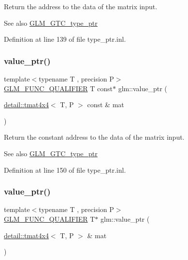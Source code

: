 Return the address to the data of the matrix input. \begin{DoxySeeAlso}{See also}
\hyperlink{group__gtc__type__ptr}{G\+L\+M\+\_\+\+G\+T\+C\+\_\+type\+\_\+ptr} 
\end{DoxySeeAlso}


Definition at line 139 of file type\+\_\+ptr.\+inl.

\mbox{\label{group__gtc__type__ptr_gaa99522f78635f6949ebf82f065bafa94}} 
\subsubsection{\texorpdfstring{value\+\_\+ptr()}{value\_ptr()}\hspace{0.1cm}{\footnotesize\ttfamily [12/27]}}
{\footnotesize\ttfamily template$<$typename T , precision P$>$ \\
\hyperlink{setup_8hpp_a33fdea6f91c5f834105f7415e2a64407}{G\+L\+M\+\_\+\+F\+U\+N\+C\+\_\+\+Q\+U\+A\+L\+I\+F\+I\+ER} T const$\ast$ glm\+::value\+\_\+ptr (\begin{DoxyParamCaption}\item[{\hyperlink{structglm_1_1detail_1_1tmat4x4}{detail\+::tmat4x4}$<$ T, P $>$ const \&}]{mat }\end{DoxyParamCaption})}

Return the constant address to the data of the matrix input. \begin{DoxySeeAlso}{See also}
\hyperlink{group__gtc__type__ptr}{G\+L\+M\+\_\+\+G\+T\+C\+\_\+type\+\_\+ptr} 
\end{DoxySeeAlso}


Definition at line 150 of file type\+\_\+ptr.\+inl.

\mbox{\label{group__gtc__type__ptr_ga46c85fe444b7260c496be5fe0c146e87}} 
\subsubsection{\texorpdfstring{value\+\_\+ptr()}{value\_ptr()}\hspace{0.1cm}{\footnotesize\ttfamily [13/27]}}
{\footnotesize\ttfamily template$<$typename T , precision P$>$ \\
\hyperlink{setup_8hpp_a33fdea6f91c5f834105f7415e2a64407}{G\+L\+M\+\_\+\+F\+U\+N\+C\+\_\+\+Q\+U\+A\+L\+I\+F\+I\+ER} T$\ast$ glm\+::value\+\_\+ptr (\begin{DoxyParamCaption}\item[{\hyperlink{structglm_1_1detail_1_1tmat4x4}{detail\+::tmat4x4}$<$ T, P $>$ \&}]{mat }\end{DoxyParamCaption})}

